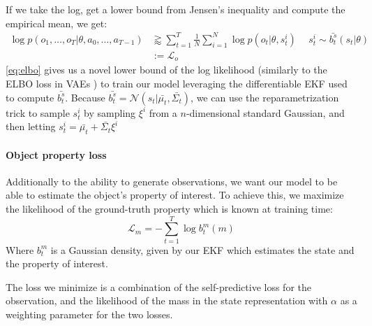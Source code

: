 \documentclass[anon]{l4dc2024}
\begin{document}
If we take the log, get a lower bound from Jensen's inequality and compute the empirical mean, we get:
\begin{align}
    \label{eq:elbo}
    \log p(o_1, \dots, o_T | \theta, a_0, \dots, a_{T-1}) & \gtrapprox \sum_{t=1}^{T} \frac{1}{N}\sum_{i=1}^{N} \log p(o_t|\theta, s_t^i) \hspace{15pt} s_t^i \sim \bar{b_t^s}(s_t|\theta) \\
                                                          & := \mathcal{L}_o
\end{align}
\autoref{eq:elbo} gives us a novel lower bound of the log likelihood (similarly to the ELBO loss in VAEs \cite{vae}) to train our model leveraging the differentiable \ac{EKF} \citep{bohgukf} used to compute $\bar{b_t^s}$.
Because $\bar{b_t^s} = \mathcal{N}(s_t|\bar{\mu_t}, \bar{\Sigma_t})$, we can use the reparametrization trick to sample $s_t^i$ by sampling $\xi^i$ from a $n$-dimensional standard Gaussian, and then letting
$%
    s_t^i = \bar{\mu_t} + \bar{\Sigma_t}\xi^i
$%

\paragraph{Object property loss}
Additionally to the ability to generate observations, we want our model to be able to estimate the object's property of interest.
To achieve this, we maximize the likelihood of the ground-truth property which is known at training time:
\begin{equation}
    \mathcal{L}_m = -\sum_{t=1}^T\log b_t^m(m)
\end{equation}
Where $b_t^m$ is a Gaussian density, given by our \ac{EKF} which estimates the state and the property of interest.

The loss we minimize is a combination of the self-predictive loss for the observation, and the likelihood of the mass in the state representation with $\alpha$ as a weighting parameter for the two losses.
\end{document}
